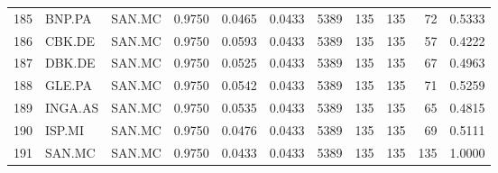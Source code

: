 \begin{table}
\begin{tabular}{lllrrrrrrrr}
185 & BNP.PA & SAN.MC & 0.9750 & 0.0465 & 0.0433 & 5389 & 135 & 135 & 72 & 0.5333 \\
186 & CBK.DE & SAN.MC & 0.9750 & 0.0593 & 0.0433 & 5389 & 135 & 135 & 57 & 0.4222 \\
187 & DBK.DE & SAN.MC & 0.9750 & 0.0525 & 0.0433 & 5389 & 135 & 135 & 67 & 0.4963 \\
188 & GLE.PA & SAN.MC & 0.9750 & 0.0542 & 0.0433 & 5389 & 135 & 135 & 71 & 0.5259 \\
189 & INGA.AS & SAN.MC & 0.9750 & 0.0535 & 0.0433 & 5389 & 135 & 135 & 65 & 0.4815 \\
190 & ISP.MI & SAN.MC & 0.9750 & 0.0476 & 0.0433 & 5389 & 135 & 135 & 69 & 0.5111 \\
191 & SAN.MC & SAN.MC & 0.9750 & 0.0433 & 0.0433 & 5389 & 135 & 135 & 135 & 1.0000 \\
\bottomrule
\end{tabular}
\end{table}

